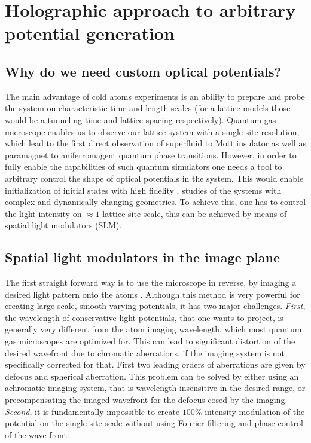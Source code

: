 
\chapter{Holographic approach to arbitrary potential generation}

\section{Why do we need custom optical potentials?}
The main advantage of cold atoms experiments is an ability to prepare and probe the system on characteristic time and length scales (for a lattice models those would be a tunneling time and lattice spacing respectively). Quantum gas microscope enables us to observe our lattice system with a single site resolution, which lead to the first direct observation of superfluid to Mott insulator \cite{Bakr2010, bloch} as well as paramagnet to aniferromagent \cite{Simon2011, Parsons??} quantum phase transitions. However, in order to fully enable the capabilities of such quantum simulators one needs a tool to arbitrary control the shape of optical potentials in the system. This would enable initialization of initial states with high fidelity \cite{us, somebody else?}, studies of the systems with complex \cite{Tilman QPC, Roatti QPC} and dynamically changing \cite{??} geometries. To achieve this, one has to control the light intensity on $\approx 1$ lattice site scale, this can be achieved by means of spatial light modulators (SLM).

\section{Spatial light modulators in the image plane}
The first straight forward way is to use the microscope in reverse, by imaging a desired light pattern onto the atoms \cite{P. Schauß thesis, RMA thesis, MAZU thesis}. Although this method is very powerful for creating large scale, smooth-varying potentials, it has two major challenges. \textit{First}, the wavelength of conservative light potentials, that one wants to project, is generally very different from the atom imaging wavelength, which most quantum gas microscopes are optimized for. This can lead to significant distortion of the desired wavefront due to chromatic aberrations, if the imaging system is not specifically corrected for that. First two leading orders of aberrations are given by defocus and spherical aberration. This problem can be solved by either using an achromatic imaging system, that is wavelength insensitive in the desired range, or precompensating the imaged wavefront for the defocus cosed by the imaging. \textit{Second}, it is fundamentally impossible to create $100 \%$ intensity modulation of the potential on the single site scale without using Fourier filtering and phase control of the wave front. 

